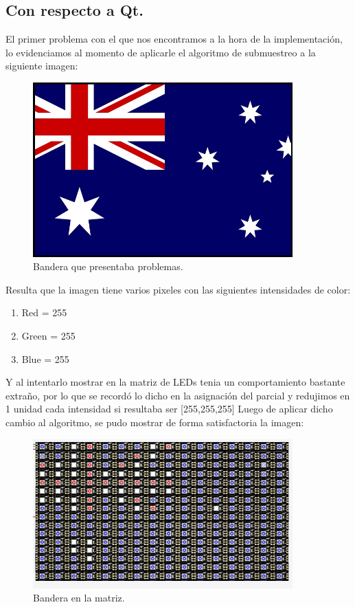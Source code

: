 \documentclass{article}
\begin{document}
\subsection{Con respecto a Qt.}
El primer problema con el que nos encontramos a la hora de la implementación, lo evidenciamos al momento de aplicarle el algoritmo de submuestreo a la siguiente imagen:
\begin{figure}[h]
  \includegraphics[width=10cm]{bandera_con_problemas.jpg}
  \centering
  \caption{Bandera que presentaba problemas.}
  \label{fig:guia}
\end{figure}
Resulta que la imagen tiene varios pixeles con las siguientes intensidades de color:
\begin{enumerate}
    \item Red = 255
    \item Green = 255
    \item Blue = 255
\end{enumerate}
Y al intentarlo mostrar en la matriz de LEDs tenia un comportamiento bastante extraño, por lo que se recordó lo dicho en la asignación del parcial y redujimos en 1 unidad cada intensidad si resultaba ser [255,255,255]
Luego de aplicar dicho cambio al algoritmo, se pudo mostrar de forma satisfactoria la imagen:
\begin{figure}[h]
  \includegraphics[width=10cm]{bandera_en_matriz.jpeg}
  \centering
  \caption{Bandera en la matriz.}
  \label{fig:guia}
\end{figure}
\end{document}
